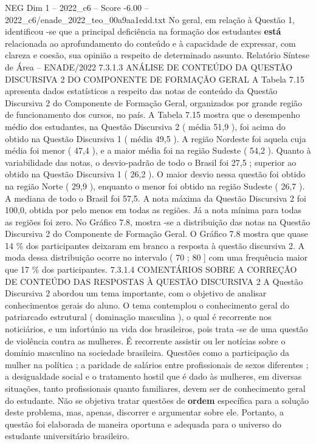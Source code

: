 \begin{textsample}{NEG Dim 1 – 2022\_c6 – Score -6.00 – 2022\_c6/enade\_2022\_teo\_00a9aa1edd.txt}
No geral, em relação à Questão 1, identificou -se que a principal deficiência na formação dos estudantes \textbf{está} relacionada ao aprofundamento do conteúdo e à capacidade de expressar, com clareza e coesão, sua opinião a respeito de determinado assunto.
Relatório Síntese de Área – ENADE/2022 7.3.1.3 ANÁLISE DE CONTEÚDO DA QUESTÃO DISCURSIVA 2 DO COMPONENTE DE FORMAÇÃO GERAL A Tabela 7.15 apresenta dados estatísticos a respeito das notas de conteúdo da Questão Discursiva 2 do Componente de Formação Geral, organizados por grande região de funcionamento dos cursos, no país.
A Tabela 7.15 mostra que o desempenho médio dos estudantes, na Questão Discursiva 2 ( média 51,9 ), foi acima do obtido na Questão Discursiva 1 ( média 49,5 ).
A região Nordeste foi aquela cuja média foi menor ( 47,4 ), e a maior média foi na região Sudeste ( 54,2 ).
Quanto à variabilidade das notas, o desvio-padrão de todo o Brasil foi 27,5 ; superior ao obtido na Questão Discursiva 1 ( 26,2 ).
O maior desvio nessa questão foi obtido na região Norte ( 29,9 ), enquanto o menor foi obtido na região Sudeste ( 26,7 ).
A mediana de todo o Brasil foi 57,5.
A nota máxima da Questão Discursiva 2 foi 100,0, obtida por pelo menos em todas as regiões.
Já a nota mínima para todas as regiões foi zero.
No Gráfico 7.8, mostra -se a distribuição das notas na Questão Discursiva 2 do Componente de Formação Geral.
O Gráfico 7.8 mostra que quase 14 \% dos participantes deixaram em branco a resposta à questão discursiva 2.
A moda dessa distribuição ocorre no intervalo ( 70 ; 80 ] com uma frequência maior que 17 \% dos participantes. 7.3.1.4 COMENTÁRIOS SOBRE A CORREÇÃO DE CONTEÚDO DAS RESPOSTAS À QUESTÃO DISCURSIVA 2 A Questão Discursiva 2 abordou um tema importante, com o objetivo de analisar conhecimentos gerais do aluno.
O tema contemplou o conhecimento geral do patriarcado estrutural ( dominação masculina ), o qual é recorrente nos noticiários, e um infortúnio na vida dos brasileiros, pois trata -se de uma questão de violência contra as mulheres.
É recorrente assistir ou ler notícias sobre o domínio masculino na sociedade brasileira.
Questões como a participação da mulher na política ; a paridade de salários entre profissionais de sexos diferentes ; a desigualdade social e o tratamento hostil que é dado às mulheres, em diversas situações, tanto profissionais quanto familiares, devem ser de conhecimento geral do estudante.
Não se objetiva tratar questões de \textbf{ordem} específica para a solução deste problema, mas, apenas, discorrer e argumentar sobre ele.
Portanto, a questão foi elaborada de maneira oportuna e adequada para o universo do estudante universitário brasileiro.

\end{textsample}
